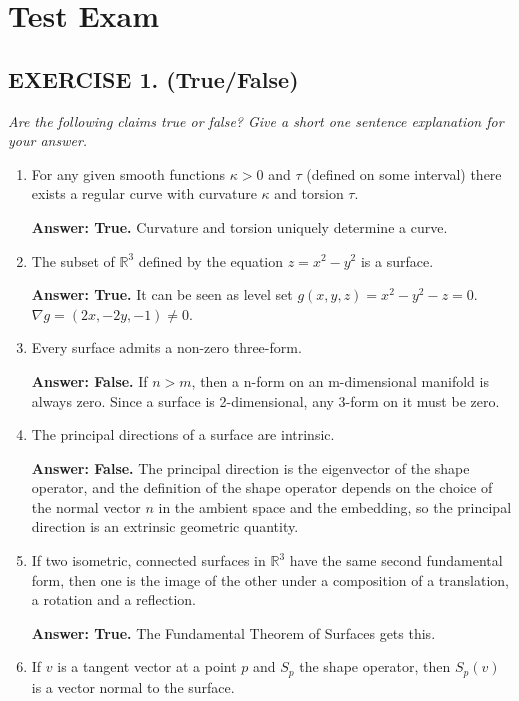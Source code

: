 \documentclass[a4paper,12pt]{article}
\newcommand{\sol}[1]{\textcolor{examplecolor}{#1}}
\begin{document}
\section{Test Exam}
\subsection{EXERCISE 1. (True/False)}
\textit{Are the following claims true or false? Give a short one sentence explanation for your answer.}
\begin{enumerate}[label=(\roman*)]
    \item For any given smooth functions $\kappa>0$ and $\tau$ (defined on some interval) there exists a regular curve with curvature $\kappa$ and torsion $\tau$.\par
    \textbf{Answer: True.}
    \sol{Curvature and torsion uniquely determine a curve.}
    \item The subset of $\mathbb{R}^{3}$ defined by the equation $z=x^{2}-y^{2}$ is a surface.\par
    \textbf{Answer: True.}
    \sol{It can be seen as level set $g(x,y,z) = x^2 - y^2 - z=0$.$\nabla g = (2x, -2y, -1)\neq 0$.}

    \item Every surface admits a non-zero three-form.
    
    \textbf{Answer: False.}
    \sol{If $n>m$, then a n-form on an m-dimensional manifold is always zero. Since a surface is 2-dimensional, any 3-form on it must be zero.}

    \item The principal directions of a surface are intrinsic.
    
    \textbf{Answer: False.}
    \sol{The principal direction is the eigenvector of the shape operator, and the definition of the shape operator depends on the choice of the normal vector $n$ in the ambient space and the embedding, so the principal direction is an extrinsic geometric quantity.}

    \item If two isometric, connected surfaces in $\mathbb{R}^{3}$ have the same second fundamental form, then one is the image of the other under a composition of a translation, a rotation and a reflection.
    
    \textbf{Answer: True.}
    \sol{The Fundamental Theorem of Surfaces gets this.}

    \item If $v$ is a tangent vector at a point $p$ and $S_{p}$ the shape operator, then $S_{p}(v)$ is a vector normal to the surface.
    

\end{enumerate}
\end{document}
